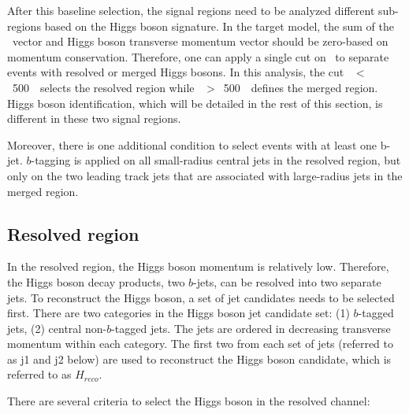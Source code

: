 \par After this baseline selection, the signal regions need to be analyzed different sub-regions based on the Higgs boson signature. 
In the target model, the sum of the \met~vector and Higgs boson transverse momentum vector should be zero-based on momentum conservation. 
Therefore, one can apply a single cut on \met~to separate events with resolved or merged Higgs bosons. In this analysis, the cut \met~$<$~500~\GeV~selects the resolved region while \met~$>$~500~\GeV~defines the merged region. Higgs boson identification, which will be detailed in the rest of this section, is different in these two signal regions.
\par Moreover, there is one additional condition to select events with at least one b-jet. $b$-tagging is applied on all small-radius central jets in the resolved region, but only on the two leading track jets that are associated with large-radius jets in the merged region.

\subsection{Resolved region}

\par In the resolved region, the Higgs boson momentum is relatively low. Therefore, the Higgs boson decay products, two $b$-jets, can be resolved into two separate jets. To reconstruct the Higgs boson, a set of jet candidates needs to be selected first. There are two categories in the Higgs boson jet candidate set: (1) $b$-tagged jets, (2) central non-$b$-tagged jets. The jets are ordered in decreasing transverse momentum within each category. The first two from each set of jets (referred to as j1 and j2 below) are used to reconstruct the Higgs boson candidate, which is referred to as $H_{reco}$.

\par There are several criteria to select the Higgs boson in the resolved channel:

